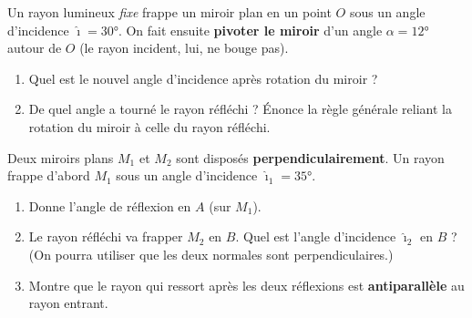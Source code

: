 \documentclass[11pt,a4paper]{article}
\begin{document}
\begin{exo}
Un rayon lumineux \emph{fixe} frappe un miroir plan en un point $O$ sous un angle d'incidence
$\hat{\imath}=\ang{30}$. On fait ensuite \textbf{pivoter le miroir} d'un angle $\alpha=\ang{12}$
autour de $O$ (le rayon incident, lui, ne bouge pas).
\begin{enumerate}[label=\alph*)]
  \item Quel est le nouvel angle d'incidence après rotation du miroir ?
  \item De quel angle a tourné le rayon réfléchi ? Énonce la règle générale reliant la rotation du
        miroir à celle du rayon réfléchi.
\end{enumerate}
\end{exo}

\begin{exo}
Deux miroirs plans $M_1$ et $M_2$ sont disposés \textbf{perpendiculairement}. Un rayon frappe d'abord
$M_1$ sous un angle d'incidence $\hat{\imath}_1=\ang{35}$.
\begin{center}
\end{center}
\begin{enumerate}[label=\alph*)]
  \item Donne l'angle de réflexion en $A$ (sur $M_1$).
  \item Le rayon réfléchi va frapper $M_2$ en $B$. Quel est l'angle d'incidence $\hat{\imath}_2$ en $B$ ?
        (On pourra utiliser que les deux normales sont perpendiculaires.)
  \item Montre que le rayon qui ressort après les deux réflexions est \textbf{antiparallèle} au rayon
        entrant.
\end{enumerate}
\end{exo}
\end{document}
